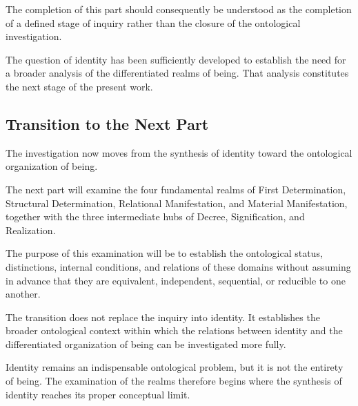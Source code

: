 The completion of this part should consequently
be understood as the completion of a defined
stage of inquiry rather than the closure of the
ontological investigation.

The question of identity has been sufficiently
developed to establish the need for a broader
analysis of the differentiated realms of being.
That analysis constitutes the next stage of
the present work.


\subsection{Transition to the Next Part}

The investigation now moves from the synthesis
of identity toward the ontological organization
of being.

The next part will examine the four fundamental
realms of First Determination, Structural
Determination, Relational Manifestation, and
Material Manifestation, together with the
three intermediate hubs of Decree, Signification,
and Realization.

The purpose of this examination will be to
establish the ontological status, distinctions,
internal conditions, and relations of these
domains without assuming in advance that they
are equivalent, independent, sequential, or
reducible to one another.

The transition does not replace the inquiry
into identity. It establishes the broader
ontological context within which the relations
between identity and the differentiated
organization of being can be investigated
more fully.

Identity remains an indispensable ontological
problem, but it is not the entirety of being.
The examination of the realms therefore begins
where the synthesis of identity reaches its
proper conceptual limit.

